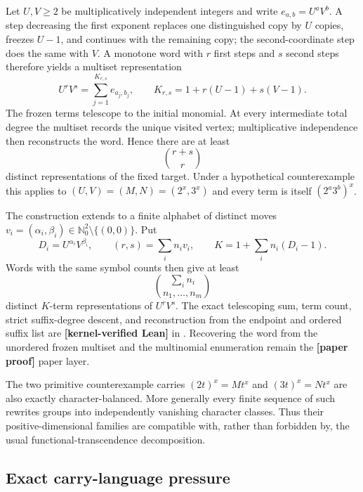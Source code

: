 \documentclass[11pt,oneside]{article}
\theoremstyle{definition}
\theoremstyle{remark}
\newcommand{\lean}[1]{\texttt{\detokenize{#1}}}
\newcommand{\statuslean}{\textcolor{leanblue}{\textbf{[kernel-verified Lean]}}}
\newcommand{\statusnew}{\textcolor{newgreen}{\textbf{[paper proof]}}}
\begin{document}
Let $U,V\ge2$ be multiplicatively independent integers and write
$e_{a,b}=U^aV^b$.  A step decreasing the first exponent replaces one distinguished copy by
$U$ copies, freezes $U-1$, and continues with the remaining copy; the second-coordinate
step does the same with $V$.  A monotone word with $r$ first steps and $s$ second steps
therefore yields a multiset representation
\begin{equation}
 U^rV^s=\sum_{j=1}^{K_{r,s}} e_{a_j,b_j},\qquad
 K_{r,s}=1+r(U-1)+s(V-1).
 \label{carry:eq-path-representation}
\end{equation}
The frozen terms telescope to the initial monomial.  At every intermediate total degree the
multiset records the unique visited vertex; multiplicative independence then reconstructs
the word.  Hence there are at least
\begin{equation}
 \binom{r+s}{r}
 \label{carry:eq-binomial-fiber}
\end{equation}
distinct representations of the fixed target.  Under a hypothetical counterexample this
applies to $(U,V)=(M,N)=(2^x,3^x)$ and every term is itself
$(2^a3^b)^x$.

The construction extends to a finite alphabet of distinct moves
$v_i=(\alpha_i,\beta_i)\in\mathbb N_0^2\setminus\{(0,0)\}$.  Put
\[
 D_i=U^{\alpha_i}V^{\beta_i},\qquad
 (r,s)=\sum_i n_iv_i,\qquad
 K=1+\sum_i n_i(D_i-1).
\]
Words with the same symbol counts then give at least
\begin{equation}
 \binom{\sum_i n_i}{n_1,\ldots,n_m}
 \label{carry:eq-multinomial-fiber}
\end{equation}
distinct $K$-term representations of $U^rV^s$.  The exact telescoping sum, term count,
strict suffix-degree descent, and reconstruction from the endpoint and ordered suffix list
are \statuslean{} in \lean{CarryPath}.  Recovering the word from the unordered
frozen multiset and the multinomial enumeration remain the \statusnew{} paper layer.

The two primitive counterexample carries $(2t)^x=Mt^x$ and $(3t)^x=Nt^x$ are also exactly
character-balanced.  More generally every finite sequence of such rewrites groups into
independently vanishing character classes.  Thus their positive-dimensional families are
compatible with, rather than forbidden by, the usual functional-transcendence
decomposition.

\subsection{Exact carry-language pressure}
\label{carry:pressure}
\end{document}
